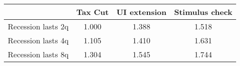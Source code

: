 \begin{tabular}{@{}lccc@{}} 
\toprule 
& Tax Cut    & UI extension    & Stimulus check    \\  \midrule 
Recession lasts 2q &1.000  & 1.388  & 1.518     \\ 
Recession lasts 4q &1.105  & 1.410  & 1.631     \\ 
Recession lasts 8q &1.304  & 1.545  & 1.744     \\ 
\end{tabular}  
